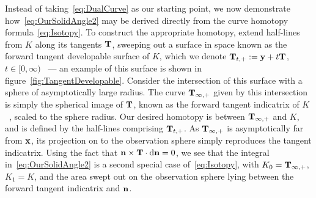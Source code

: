     Instead of taking~\eqref{eq:DualCurve} as our starting point, we now demonstrate how~\eqref{eq:OurSolidAngle2} may be derived directly from the curve homotopy formula~\eqref{eq:Isotopy}. To construct the appropriate homotopy, extend half-lines from $K$ along its tangents ${\bf T}$, sweeping out a surface in space known as the forward tangent developable surface of $K$, which we denote ${\bf{T}}_{t,+}:={\bf y} + t {\bf T}$, $t\in [0,\infty)$~\citep{Eisenhart} --- an example of this surface is shown in figure~\ref{fig:TangentDevelopable}. Consider the intersection of this surface with a sphere of asymptotically large radius. The curve ${\bf T}_{\infty, +}$ given by this intersection is simply the spherical image of $\bf T$, known as the forward tangent indicatrix of $K$ ~\citep{Eisenhart}, scaled to the sphere radius. Our desired homotopy is between $\bf T_{\infty,+}$ and $K$, and is defined by the half-lines comprising ${\bf{T}}_{t,+}$. As $\bf T_{\infty,+}$ is asymptotically far from ${\bf x}$, its projection on to the observation sphere simply reproduces the tangent indicatrix. Using the fact that ${\bf n} \times {\bf T} \cdot \mathrm{d}{\bf n} = 0$, we see that the integral in~\eqref{eq:OurSolidAngle2} is a second special case of~\eqref{eq:Isotopy}, with $K_0 = {\bf T}_{\infty,+}$, $K_1 =K$, and the area swept out on the observation sphere lying between the forward tangent indicatrix and $\bf n$. 

